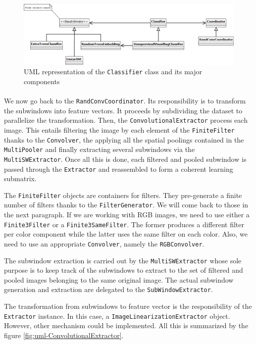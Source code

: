 \documentclass[a4paper]{report}
\begin{document}
		
		\begin{figure}
			\centering
				\includegraphics[width=1.00\textwidth]{images/uml-classifier.png}
			\caption{UML representation of the \texttt{Classifier} class and its major components}
			\label{fig:uml-classifier}
		\end{figure}
		
		
		\paragraph{}
		We now go back to the \texttt{RandConvCoordinator}. Its responsibility is to transform the subwindows into feature vectors. It proceeds by subdividing the dataset to parallelize the transformation. Then, the \texttt{ConvolutionalExtractor} process each image. This entails filtering the image by each element of the \texttt{FiniteFilter} thanks to the \texttt{Convolver}, the applying all the spatial poolings contained in the \texttt{MultiPooler} and finally extracting several subwindows via the \texttt{MultiSWExtractor}. Once all this is done, each filtered and pooled subwindow is passed through the \texttt{Extractor} and reassembled to form a coherent learning submatrix.
		\par
		The \texttt{FiniteFilter} objects are containers for filters. They pre-generate a finite number of filters thanks to the \texttt{FilterGenerator}. We will come back to those in the next paragraph. If we are working with RGB images, we need to use either a \texttt{Finite3Filter} or a \texttt{Finite3SameFilter}. The former produces a different filter per color component while the latter uses the same filter on each color. Also, we need to use an appropriate \texttt{Convolver}, namely the \texttt{RGBConvolver}.
		\par
		The subwindow extraction is carried out by the \texttt{MultiSWExtractor} whose sole purpose is to keep track of the subwindows to extract to the set of filtered and pooled images belonging to the same original image. The actual subwindow generation and extraction are delegated to the \texttt{SubWindowExtractor}.
		\par
		The transformation from subwindows to feature vector is the responsibility of the \texttt{Extractor} instance. In this case, a \texttt{ImageLinearizationExtractor} object. However, other mechanism could be implemented.
		All this is summarized by the figure \ref{fig:uml-ConvolutionalExtractor}.
		
\end{document}
